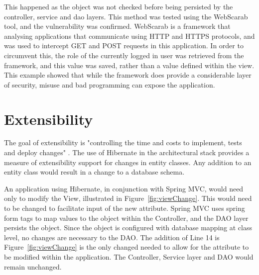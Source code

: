 This happened as the object was not checked before being persisted by the controller, service and dao layers. This method was tested using the WebScarab tool, and the vulnerability was confirmed. WebScarab is a framework that analysing applications that communicate using HTTP and HTTPS protocols, and was used to intercept GET and POST requests in this application. In order to circumvent this, the role of the currently logged in user was retrieved from the framework, and this value was saved, rather than a value defined within the view. This example showed that while the framework does provide a considerable layer of security, misuse and bad programming can expose the application. 

\section{Extensibility}

The goal of extensibility is "controlling the time and costs to implement, tests and deploy changes" \parencite{bass2003software}. The use of Hibernate in the architectural stack provides a measure of extensibility support for changes in entity classes. Any addition to an entity class would result in a change to a database schema. 

An application using Hibernate, in conjunction with Spring MVC, would need only to modify the View, illustrated in Figure~\ref{fig:viewChange}. This would need to be changed to facilitate input of the new attribute. Spring MVC uses spring form tags to map values to the object within the Controller, and the DAO layer persists the object. Since the object is configured with database mapping at class level, no changes are necessary to the DAO. The addition of Line 14 is Figure~\ref{fig:viewChange} is the only changed needed to allow for the attribute to be modified within the application. The Controller, Service layer and DAO would remain unchanged.

